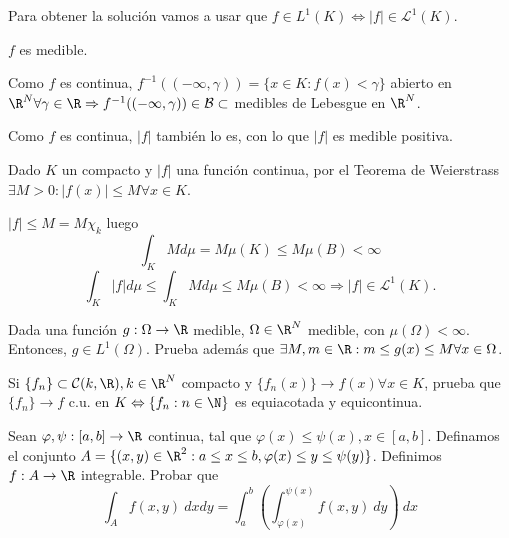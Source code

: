   \begin{sol}
    Para obtener la solución vamos a usar que $f \in L^1(K) \Leftrightarrow |f|
    \in \mathcal L^1(K)$.

    $f$ es medible.

    Como $f$ es continua, $f^{-1}((-\infty, \gamma)) = \{ x \in K : f(x) <
    \gamma\}$ abierto en $\R^N \forall \gamma \in \R \Rightarrow
    f^{-1}((-\infty, \gamma)) \in \mathcal B \subset$ medibles de Lebesgue en
    $\R^N$.

    Como $f$ es continua, $|f|$ también lo es, con lo que $|f|$ es medible
    positiva.

    Dado $K$ un compacto y $|f|$ una función continua, por el Teorema de
    Weierstrass $\exists M > 0 : |f(x)| \leq M \forall x \in K$.

    $|f| \leq M = M \chi_k$ luego $$\int_K Md\mu = M\mu(K) \leq M \mu (B) <
    \infty$$ $$\int_K |f|d\mu \leq \int_K Md\mu \leq M\mu(B) < \infty \Rightarrow
    |f| \in \mathcal L^1(K).$$

  \end{sol}

\begin{ejer}
  Dada una función $g : \Omega \rightarrow \R$ medible, $\Omega \in \R^N$
  medible, con $\mu(\Omega) < \infty$. Entonces, $ g \in L^1(\Omega)$. Prueba
  además que $\exists M, m \in \R : m \leq g(x) \leq M \forall x \in \Omega$.
\end{ejer}

\begin{ejer}
  Si $\{f_n\} \subset \mathcal C(k, \R), k \in \R^N$ compacto y $\{f_n(x)\}
  \rightarrow f(x) \forall x \in K$, prueba que $\{f_n\} \rightarrow f$ c.u. en
  $K \Leftrightarrow \{f_n : n \in \N\}$ es equiacotada y equicontinua.
\end{ejer}

\begin{ejer}
  Sean $\varphi, \psi : [a, b] \rightarrow \R$ continua, tal que $\varphi(x)
  \leq \psi(x), x \in [a, b]$. Definamos el conjunto $A = \{ (x, y) \in \R^2 : a
  \leq x \leq b, \varphi(x) \leq y \leq \psi(y) \}$. Definimos $f : A
  \rightarrow \R$ integrable. Probar que
  $$ \int_A f(x, y) \ dxdy = \int_a^b \left( \int_{\varphi(x)}^{\psi(x)} f(x,y)
    \ dy \right) \ dx$$
\end{ejer}

\begin{sol}
\end{sol}

